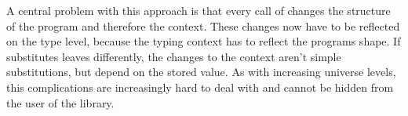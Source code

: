 A central problem with this approach is that every call of \AgdaFunction{>>=}
changes the structure of the program and therefore the context.
These changes now have to be reflected on the type level, because the typing
context has to reflect the programs shape.
If \AgdaFunction{>>=} substitutes leaves differently, the changes to the context
aren't simple substitutions, but depend on the stored value.
As with increasing universe levels, this complications are increasingly hard to
deal with and cannot be hidden from the user of the library.

